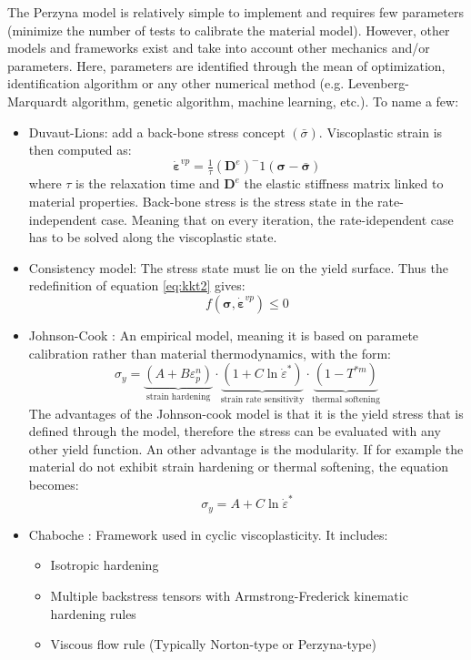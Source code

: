 \documentclass[final,5p,times,twocolumn]{elsarticle}
\begin{document}
The Perzyna model is relatively simple to implement and requires few parameters (minimize the number of tests to calibrate the material model). However, other models and frameworks exist and take into account other mechanics and/or parameters. Here, parameters are identified through the mean of optimization, identification algorithm or any other numerical method (e.g. Levenberg-Marquardt algorithm, genetic algorithm, machine learning, etc.). To name a few:
\begin{itemize}
  \item Duvaut-Lions: add a back-bone stress concept $(\bar{\sigma})$. Viscoplastic strain is then computed as:
  \begin{equation}
    \boldsymbol{\dot{\varepsilon}}^{vp} = \tfrac{1}{\tau}\left( \boldsymbol{D}^e\right)^-1(\boldsymbol{\sigma} - \boldsymbol{\bar{\sigma}})
  \end{equation}
  where $\tau$ is the relaxation time and $\boldsymbol{D}^e$ the elastic stiffness matrix linked to material properties. Back-bone stress is the stress state in the rate-independent case. Meaning that on every iteration, the rate-idependent case has to be solved along the viscoplastic state.
  
  \item Consistency model: The stress state must lie on the yield surface. Thus the redefinition of equation \ref{eq:kkt2} gives:
  \begin{equation}
    f(\boldsymbol{\sigma},\boldsymbol{\dot{\varepsilon}}^{vp}) \leq 0
  \end{equation}
  \item Johnson-Cook \cite{Johnson1983}: An empirical model, meaning it is based on paramete calibration rather than material thermodynamics, with the form:
  \begin{equation}
    \sigma_y = \underbrace{(A + B \varepsilon_p^n)}_{\text{strain hardening}} \cdot \underbrace{(1 + C \ln \dot{\varepsilon}^*)}_{\text{strain rate sensitivity}} \cdot \underbrace{(1 - T^{*m})}_{\text{thermal softening}}
  \end{equation}
   The advantages of the Johnson-cook model is that it is the yield stress that is defined through the model, therefore the stress can be evaluated with any other yield function. An other advantage is the modularity. If for example the material do not exhibit strain hardening or thermal softening, the equation becomes:
  \begin{equation}
    \sigma_y = A + C \ln \dot{\varepsilon}^*
  \end{equation}
  \item Chaboche \cite{Chaboche1986}: Framework used in cyclic viscoplasticity. It includes:
  \begin{itemize}
    \item Isotropic hardening
    \item Multiple backstress tensors with Armstrong-Frederick kinematic hardening rules
    \item Viscous flow rule (Typically Norton-type or Perzyna-type)
  \end{itemize}   
  
\end{itemize}
\end{document}
